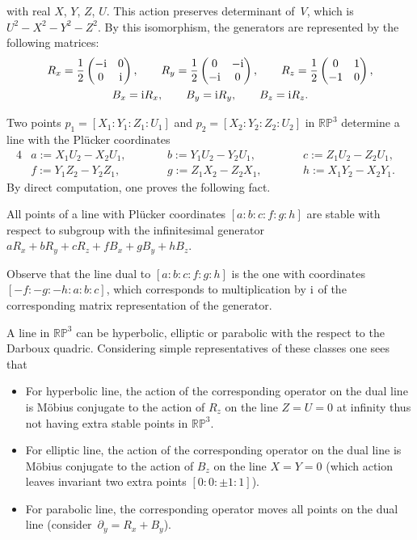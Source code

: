with real $X$, $Y$, $Z$, $U$. This action preserves determinant of~$V$, which is $U^2-X^2-Y^2-Z^2$.
By this isomorphism, the generators are represented by the following matrices:
\begin{gather*}
R_x=\frac{1}{2}\left(
\begin{matrix}
-{\rm i} & 0\\
0 & {\rm i}
\end{matrix}
 \right),\qquad
 R_y=\frac{1}{2}\left(
\begin{matrix}
0 & -{\rm i}\\
-{\rm i} & 0
\end{matrix}
 \right),\qquad
 R_z=\frac{1}{2}\left(
\begin{matrix}
0 & 1\\
-1 & 0
\end{matrix}
 \right),
\\
B_x={\rm i}R_x,\qquad B_y={\rm i}R_y, \qquad B_z={\rm i}R_z.
\end{gather*}

Two points $p_1=[X_1:Y_1:Z_1:U_1]$ and $p_2=[X_2:Y_2:Z_2:U_2]$ in $\mathbb{RP}^3$ determine a line with the Pl\"ucker coordinates
\begin{alignat*}{4}
& a:=X_1U_2-X_2U_1,\qquad&& b:=Y_1U_2-Y_2U_1, \qquad&& c:=Z_1U_2-Z_2U_1,&
\\
& f:=Y_1Z_2-Y_2Z_1,\qquad && g:=Z_1X_2-Z_2X_1, \qquad&& h:=X_1Y_2-X_2Y_1.&
\end{alignat*}
By direct computation, one proves the following fact.
\begin{Lemma}
All points of a line with Pl\"ucker coordinates $[a:b:c:f:g:h]$ are stable with respect to subgroup with the infinitesimal generator $aR_x+bR_y+cR_z+fB_x+gB_y+hB_z$.
\end{Lemma}
Observe that the line dual to $[a:b:c:f:g:h]$ is the one with coordinates $[-f:-g:-h:a:b:c]$, which corresponds to multiplication by ${\rm i}$ of the corresponding matrix representation of the generator.

A line in $\mathbb{RP}^3$ can be hyperbolic, elliptic or parabolic with the respect to the Darboux quadric. Considering simple representatives of these classes one sees that
\begin{itemize}\itemsep=0pt
\item[(1)] For hyperbolic line, the action of the corresponding operator on the dual line is M\"obius conjugate to the action of $R_z$ on the line $Z=U=0$ at infinity thus not having extra stable points in $\mathbb{RP}^3$.

\item[(2)] For elliptic line, the action of the corresponding operator on the dual line is M\"obius conjugate to the action of $B_z$ on the line $X=Y=0$ (which action leaves invariant two extra points $[0:0:\pm1:1]$).

\item[(3)] For parabolic line, the corresponding operator moves all points on the dual line (consider~${\partial_y=R_x+B_y}$).
\end{itemize}

